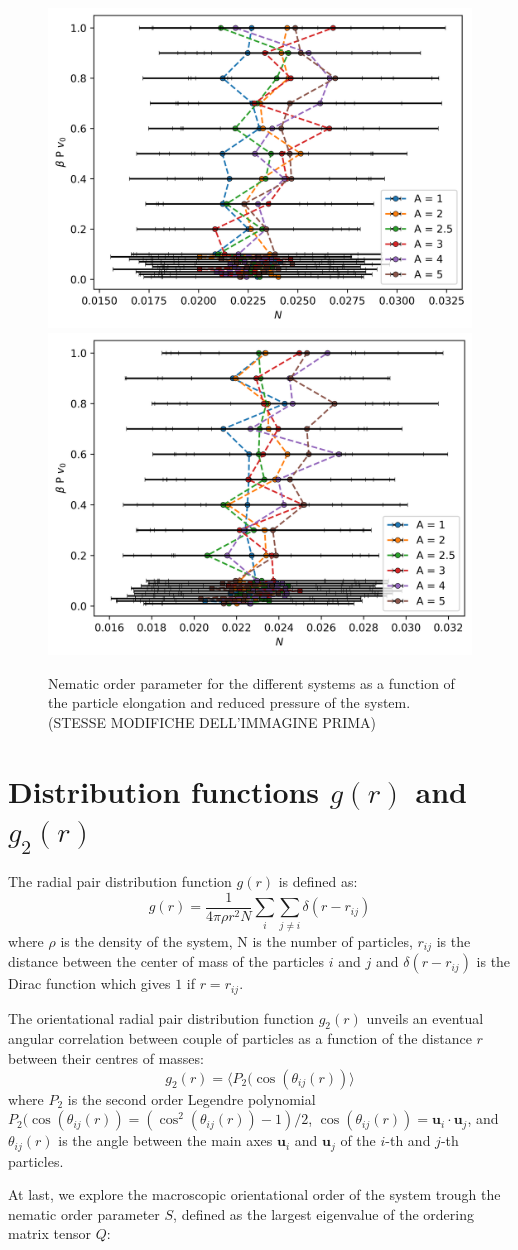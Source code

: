 \documentclass[journal=jacsat,manuscript=article]{achemso}
\begin{document}
\begin{figure}[!h]
    \includegraphics[width=0.3 \columnwidth]{Figures/S/PolyDGauss0.75.png}
    \includegraphics[width=0.3 \columnwidth]{Figures/S/PolyDLGauss0.75.png}
    \caption{Nematic order parameter for the different systems as a function of the particle elongation and reduced pressure of the system. (STESSE MODIFICHE DELL'IMMAGINE PRIMA)}
    \label{fig:S_par}
\end{figure}



\section{Distribution functions $g(r)$ and $g_2(r)$}

The  radial pair distribution function $g(r)$ is defined as:
$$g(r) = \frac{1}{4 \pi \rho r^2 N} \sum_i \sum_{j \neq i} \delta(r - r_{ij})$$
where $\rho$ is the density of the system, N is the number of particles, $r_{ij}$ is the distance between the center of mass of the particles $i$ and $j$ and $\delta(r - r_{ij})$ is the Dirac function which gives $1$ if $r = r_{ij}$.

The orientational radial pair distribution function $g_2(r)$ unveils an eventual  angular correlation between couple of  particles as a function of the distance $r$ between their centres of masses: 
$$g_2(r) = \langle P_2 (\cos(\theta_{ij}(r))\rangle$$
where $P_2$ is the second order Legendre polynomial $P_2 (\cos(\theta_{ij}(r)) = (\cos^2(\theta_{ij}(r)) - 1)/2$, $\cos(\theta_{ij}(r)) = \boldsymbol{u}_i \cdot \boldsymbol{u}_j$,  and $\theta_{ij}(r)$ is the angle between the main axes  $\boldsymbol{u}_i$ and $\boldsymbol{u}_j$ of the $i$-th and $j$-th particles. 

At last, we explore the macroscopic orientational order of the system trough the nematic order parameter $S$, defined as the largest eigenvalue of the ordering matrix tensor $Q$:
\end{document}
